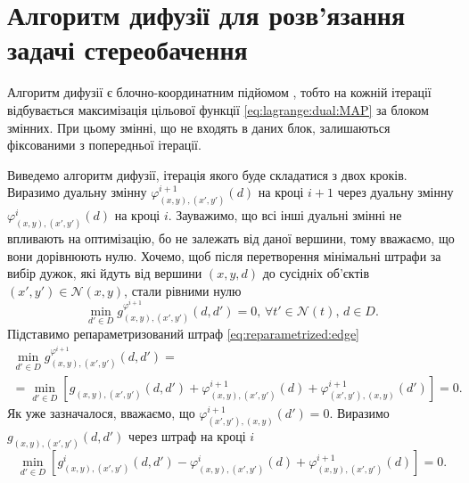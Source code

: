 \section{Алгоритм дифузії для розв'язання задачі стереобачення}

Алгоритм дифузії є блочно-координатним підйомом
\cite{overview:savchynskyy:diffusion},
тобто на кожній ітерації відбувається максимізація цільової функції
\eqref{eq:lagrange:dual:MAP} за блоком змінних.
При цьому змінні, що не входять в даних блок,
залишаються фіксованими з попередньої ітерації.

Виведемо алгоритм дифузії, ітерація якого буде складатися з двох кроків.
Виразимо дуальну змінну
$\varphi_{\left(x, y \right), \left(x', y' \right)}^{i + 1} \left( d \right)$
на кроці $i + 1$ через дуальну змінну
$\varphi_{\left(x, y \right), \left(x', y' \right)}^{i} \left( d \right)$
на кроці $i$.
Зауважимо, що всі інші дуальні змінні не впливають на оптимізацію,
бо не залежать від даної вершини, тому вважаємо, що вони дорівнюють нулю.
Хочемо, щоб після перетворення мінімальні штрафи за вибір дужок,
які йдуть від вершини $\left(x, y, d \right)$ до сусідніх об'єктів
$\left(x', y' \right) \in \mathcal{N} \left(x, y \right)$, стали рівними нулю
\begin{equation} \label{eq:requirement:1}
    \min \limits_{d' \in D} g_{\left(x, y \right), \left(x', y' \right)}^{\varphi^{i + 1}}
    \left(
        d, d' \right
    ) = 0, \, \forall t' \in \mathcal{N} \left(t \right), \, d \in D.
\end{equation}
Підставимо репараметризований штраф \eqref{eq:reparametrized:edge}
\begin{equation*}
\begin{gathered}
    \min \limits_{d' \in D}
        g_{\left(x, y \right), \left(x', y' \right)}^{\varphi^{i + 1}}
    \left(
        d, d' \right
    ) = \\
    = \min \limits_{d' \in D} \left[
        g_{\left(x, y \right), \left(x', y' \right)} \left( d, d' \right) +
        \varphi_{\left(x, y \right), \left(x', y' \right)}^{i + 1} \left( d \right) +
        \varphi_{\left(x', y' \right), \left(x, y \right)}^{i + 1} \left( d' \right)
    \right] = 0.
\end{gathered}
\end{equation*}
Як уже зазначалося, вважаємо, що
$\varphi_{\left(x', y' \right), \left(x, y \right)}^{i + 1} \left( d' \right) =
    0$.
Виразимо $g_{\left(x, y \right), \left(x', y' \right)} \left( d, d' \right)$
через штраф на кроці $i$
\begin{equation*}
    \min \limits_{d' \in D} \left[
        g_{\left(x, y \right), \left(x', y' \right)}^{i} \left( d, d' \right) -
        \varphi_{\left(x, y \right), \left(x', y' \right)}^{i} \left( d \right) +
        \varphi_{\left(x, y \right), \left(x', y' \right)}^{i + 1} \left( d \right)
    \right] = 0.
\end{equation*}
